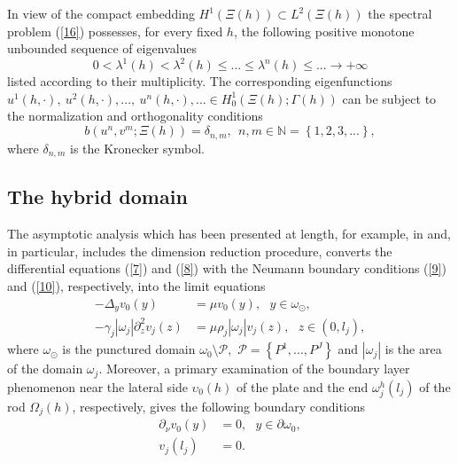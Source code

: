\documentclass[11pt]{article}%
\numberwithin{equation}{section}
\begin{document}
In view of the compact embedding $H^{1}\left(  \Xi\left(  h\right)  \right)
\subset L^{2}\left(  \Xi\left(  h\right)  \right)  $ the spectral problem
(\ref{16}) possesses, for every fixed $h$, the following positive monotone
unbounded sequence of eigenvalues
\begin{equation}
0<\lambda^{1}(h)<\lambda^{2}(h)\leq...\leq\lambda^{n}(h)\leq...\rightarrow
+\infty\label{18}%
\end{equation}
listed according to their multiplicity. The corresponding eigenfunctions
$u^{1}(h,\cdot),\ u^{2}(h,\cdot),...,\ u^{n}(h,\cdot),...\in H_{0}^{1}\left(
\Xi\left(  h\right)  ;\Gamma\left(  h\right)  \right)  $ can be subject to the
normalization and orthogonality conditions%
\begin{equation}
b\left(  u^{n},v^{m};\Xi\left(  h\right)  \right)  =\delta_{n,m}%
,\ \ n,m\in\mathbb{N}=\left\{  1,2,3,...\right\}  , \label{19}%
\end{equation}
where $\delta_{n,m}$ is the Kronecker symbol.

\subsection{The hybrid domain\label{sect1.3}}

The asymptotic analysis which has been presented at length, for example, in
\cite{BuCaNa1, ButCaNa1, ButCaNa2} and, in particular, includes the dimension
reduction procedure, converts the differential equations (\ref{7}) and
(\ref{8}) with the Neumann boundary conditions (\ref{9}) and (\ref{10}),
respectively, into the limit equations%
\begin{align}
-\Delta_{y}v_{0}(y)  &  =\mu v_{0}(y),\ \ \ y\in\omega_{\odot},\label{20}\\
-\gamma_{j}|\omega_{j}|\partial_{z}^{2}v_{j}(z)  &  =\mu\rho_{j}|\omega
_{j}|v_{j}(z),\ \ \ z\in(0,l_{j}), \label{21}%
\end{align}
where $\omega_{\odot}$ is the punctured domain $\omega_{0}\setminus
\mathcal{P},$ $\mathcal{P}=\left\{  P^{1},...,P^{J}\right\}  $ and
$|\omega_{j}|$ is the area of the domain $\omega_{j}$. Moreover, a primary
examination of the boundary layer phenomenon near the lateral side
$\mathbb{\upsilon}_{0}\left(  h\right)  $ of the plate and the end $\omega
_{j}^{h}(l_{j})$ of the rod $\Omega_{j}\left(  h\right)  $, respectively,
gives the following boundary conditions%
\begin{align}
\partial_{\nu}v_{0}(y)  &  =0,\ \ \ y\in\partial\omega_{0},\label{22}\\
v_{j}(l_{j})  &  =0. \label{23}%
\end{align}
\end{document}
